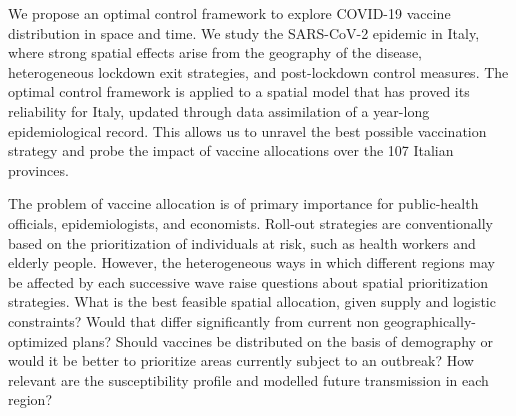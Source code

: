 We propose an optimal control framework to explore COVID-19 vaccine distribution in space and time.
We study the SARS-CoV-2 epidemic in Italy, where strong spatial effects arise from the geography of the disease, heterogeneous lockdown exit strategies, and post-lockdown control measures\cite{Marziano:RetrospectiveAnalysisItalian:2021}. The optimal control framework is applied to a spatial model that has proved its reliability for Italy\cite{Gatto:SpreadDynamicsCOVID19:2020,Bertuzzo:GeographyCOVID19Spread:2020}, updated through data assimilation of a year-long epidemiological record. This allows us to unravel the best possible vaccination strategy and probe the impact of vaccine allocations over the 107 Italian provinces.

The problem of vaccine allocation is of primary importance for  public-health officials, epidemiologists, and economists\cite{Emanuel:EthicalFrameworkGlobal:2020, Lipsitch:UnderstandingCOVID19Vaccine:2020}. 
Roll-out strategies are conventionally based on the prioritization of individuals at risk, such as health workers and elderly people\cite{Bubar:ModelinformedCOVID19Vaccine:2021,Fitzpatrick:OptimizingAgespecificVaccination:2021,Baden:EfficacySafetyMRNA1273:2020,Yang:WhoShouldBe:2021}. However, the heterogeneous ways in which different regions may be affected by each successive wave raise questions about spatial prioritization strategies. What is the best feasible spatial allocation, given supply and logistic constraints? Would that differ significantly from current non geographically-optimized plans? Should vaccines be distributed on the basis of demography or would it be better to prioritize areas currently subject to an outbreak? How relevant are the susceptibility profile and modelled future transmission in each region? 

